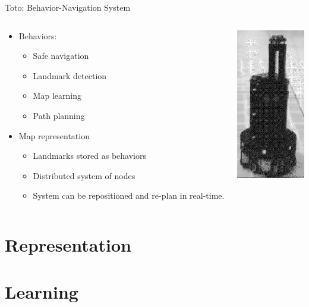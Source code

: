 \documentclass{beamer}
\begin{document}
\begin{frame}{Toto: Behavior-Navigation System}
 \begin{columns}[T]
  \begin{column}[T]{6cm}
     \begin{itemize}
      \item Behaviors:
      \begin{itemize}
	\item Safe navigation
	\item Landmark detection
	\item Map learning
	\item Path planning
      \end{itemize}
      \item Map representation
      \begin{itemize}
        \item Landmarks stored as behaviors
        \item Distributed system of nodes
        \item System can be repositioned and re-plan in real-time.
      \end{itemize}
    \end{itemize}
  \end{column}
  \begin{column}[T]{4cm}
    \includegraphics[width=3cm]{toto.png}
  \end{column}
 \end{columns}
\end{frame}

\section{Representation}
\section{Learning}
\end{document}

